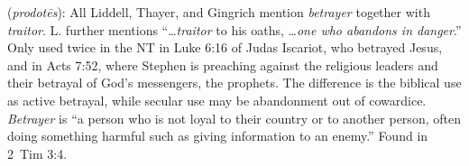 \item[Betrayer,]

(\textit{prodotēs}):
All Liddell, Thayer, and Gingrich mention \emph{betrayer} together with \emph{traitor}. 
L. further mentions ``\ldots \emph{traitor} to his oaths, \ldots \emph{one who abandons in danger}.''
Only used twice in the NT in Luke 6:16 of Judas Iscariot, who betrayed Jesus, and in Acts 7:52, where Stephen is preaching against the religious leaders and their betrayal of God’s messengers, the prophets. The difference is the biblical use as active betrayal, while secular use may be abandonment out of cowardice.
\emph{Betrayer} is ``a person who is not loyal to their country or to another person, often doing something harmful such as giving information to an enemy.''
Found in 2~Tim 3:4.
